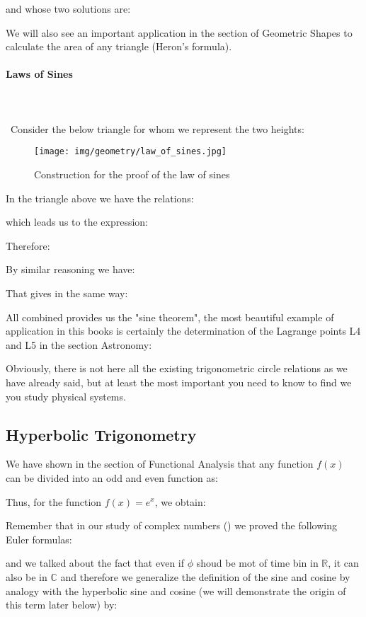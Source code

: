 	and whose two solutions are:
	
	We will also see an important application in the section of Geometric Shapes to calculate the area of any triangle (Heron's formula).
	
	\paragraph{Laws of Sines}\mbox{}\\\\\
	Consider the below triangle for whom we represent the two heights:
	\begin{figure}[H]
	\centering
	\texttt{[image: img/geometry/law\_of\_sines.jpg]}
	\caption{Construction for the proof of the law of sines}
	\end{figure}
	In the triangle above we have the relations:
	
	which leads us to the expression:
	
	Therefore:
	
	By similar reasoning we have:
	
	That gives in the same way:
	
	All combined provides us the "sine theorem", the most beautiful example of application in this books is certainly the determination of the Lagrange points L4 and L5 in the section Astronomy:
	
	Obviously, there is not here all the existing trigonometric circle relations as we have already said, but at least the most important you need to know to find we you study  physical systems.
	
	\subsection{Hyperbolic Trigonometry}
	
	We have shown in the section of Functional Analysis that any function $f (x)$ can be divided into an odd and even function as:
	
	Thus, for the function $f(x)=e^x$, we obtain:
	
	Remember that in our study of complex numbers () we proved the following Euler formulas:
	
	and we talked about the fact that even if $\phi$ shoud be mot of time bin in $\mathbb{R}$, it can also be in $\mathbb{C}$ and therefore we generalize the definition of the sine and cosine by analogy with the hyperbolic sine and cosine (we will demonstrate the origin of this term later below) by:
	
